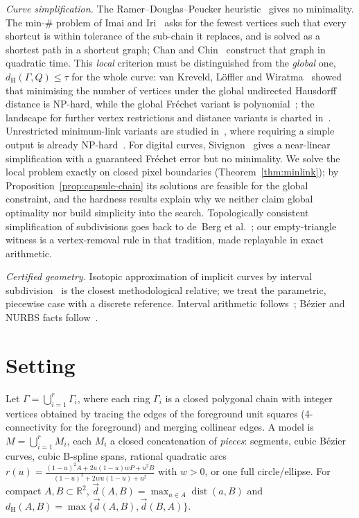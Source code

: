 \documentclass[11pt,a4paper]{article}
\theoremstyle{definition}
\theoremstyle{remark}
\newcommand{\R}{\mathbb{R}}
\newcommand{\dH}{d_{\mathrm{H}}}
\newcommand{\dist}{\operatorname{dist}}
\begin{document}
\emph{Curve simplification.} The Ramer--Douglas--Peucker
heuristic~\cite{ramer1972,douglas1973} gives no minimality. The min-\# problem
of Imai and Iri~\cite{imai1988} asks for the fewest vertices such that every
shortcut is within tolerance of the sub-chain it replaces, and is solved as a
shortest path in a shortcut graph; Chan and Chin~\cite{chan1996} construct that
graph in quadratic time. This \emph{local} criterion must be distinguished from
the \emph{global} one, $\dH(\Gamma,Q)\le\tau$ for the whole curve: van Kreveld,
L\"offler and Wiratma~\cite{vankreveld2018} showed that minimising the number
of vertices under the global undirected Hausdorff distance is NP-hard, while
the global Fr\'echet variant is polynomial~\cite{vankreveld2018,bringmann2019};
the landscape for further vertex restrictions and distance variants is charted
in~\cite{vandekerkhof2019}. Unrestricted minimum-link variants are studied
in~\cite{guibas1993,agarwal2005}, where requiring a simple output is already
NP-hard~\cite{guibas1993}. For digital curves, Sivignon~\cite{sivignon2014}
gives a near-linear simplification with a guaranteed Fr\'echet error but no
minimality. We solve the local problem exactly on closed pixel boundaries
(Theorem~\ref{thm:minlink}); by Proposition~\ref{prop:capsule-chain} its
solutions are feasible for the global constraint, and the hardness results
explain why we neither claim global optimality nor build simplicity into the
search. Topologically consistent simplification of subdivisions goes back to
de~Berg et al.~\cite{deberg1998}; our empty-triangle witness is a
vertex-removal rule in that tradition, made replayable in exact arithmetic.

\emph{Certified geometry.} Isotopic approximation of implicit curves by
interval subdivision~\cite{plantinga2004} is the closest methodological
relative; we treat the parametric, piecewise case with a discrete reference.
Interval arithmetic follows~\cite{moore2009}; B\'ezier and NURBS facts
follow~\cite{farin2002,piegl1997}.

\section{Setting}

Let $\Gamma=\bigcup_{i=1}^{r}\Gamma_i$, where each ring $\Gamma_i$ is a closed
polygonal chain with integer vertices obtained by tracing the edges of the
foreground unit squares (4-connectivity for the foreground) and merging
collinear edges. A model is $M=\bigcup_{i=1}^{r}M_i$, each $M_i$ a closed
concatenation of \emph{pieces}: segments, cubic B\'ezier curves, cubic
B-spline spans, rational quadratic arcs
$r(u)=\frac{(1-u)^2A+2u(1-u)wP+u^2B}{(1-u)^2+2wu(1-u)+u^2}$ with $w>0$, or one
full circle/ellipse. For compact $A,B\subset\R^2$,
$\vec d(A,B)=\max_{a\in A}\dist(a,B)$ and
$\dH(A,B)=\max\{\vec d(A,B),\vec d(B,A)\}$.
\end{document}
